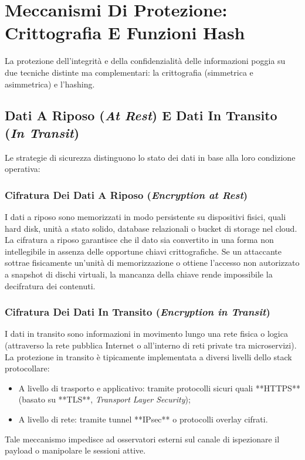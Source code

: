 \documentclass[11pt, a4paper]{article}
\begin{document}
\newpage

\section{Meccanismi Di Protezione: Crittografia E Funzioni Hash}

La protezione dell'integrità e della confidenzialità delle informazioni poggia su due tecniche distinte ma complementari: la crittografia (simmetrica e asimmetrica) e l'hashing.


\subsection{Dati A Riposo (\emph{At Rest}) E Dati In Transito (\emph{In Transit})}

Le strategie di sicurezza distinguono lo stato dei dati in base alla loro condizione operativa:

\subsubsection{Cifratura Dei Dati A Riposo (\emph{Encryption at Rest})}
I dati a riposo sono memorizzati in modo persistente su dispositivi fisici, quali hard disk, unità a stato solido, database relazionali o bucket di storage nel cloud. La cifratura a riposo garantisce che il dato sia convertito in una forma non intellegibile in assenza delle opportune chiavi crittografiche. Se un attaccante sottrae fisicamente un'unità di memorizzazione o ottiene l'accesso non autorizzato a snapshot di dischi virtuali, la mancanza della chiave rende impossibile la decifratura dei contenuti.

\subsubsection{Cifratura Dei Dati In Transito (\emph{Encryption in Transit})}
I dati in transito sono informazioni in movimento lungo una rete fisica o logica (attraverso la rete pubblica Internet o all'interno di reti private tra microservizi). La protezione in transito è tipicamente implementata a diversi livelli dello stack protocollare:
\begin{itemize}[noitemsep]
    \item A livello di trasporto e applicativo: tramite protocolli sicuri quali **HTTPS** (basato su **TLS**, \emph{Transport Layer Security});
    \item A livello di rete: tramite tunnel **IPsec** o protocolli overlay cifrati.
\end{itemize}
Tale meccanismo impedisce ad osservatori esterni sul canale di ispezionare il payload o manipolare le sessioni attive.
\end{document}
